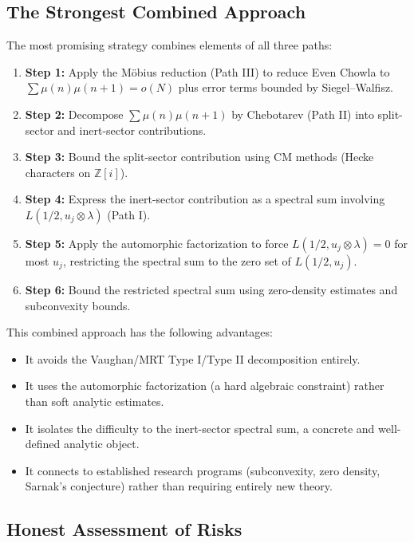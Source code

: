 \documentclass[11pt,a4paper]{article}
\theoremstyle{definition}
\begin{document}
\subsection{The Strongest Combined Approach}

The most promising strategy combines elements of all three paths:

\begin{enumerate}
\item \textbf{Step 1:} Apply the M\"obius reduction (Path III) to reduce Even Chowla to $\sum \mu(n)\mu(n+1) = o(N)$ plus error terms bounded by Siegel--Walfisz.

\item \textbf{Step 2:} Decompose $\sum \mu(n)\mu(n+1)$ by Chebotarev (Path II) into split-sector and inert-sector contributions.

\item \textbf{Step 3:} Bound the split-sector contribution using CM methods (Hecke characters on $\mathbb{Z}[i]$).

\item \textbf{Step 4:} Express the inert-sector contribution as a spectral sum involving $L(1/2, u_j \otimes \lambda)$ (Path I).

\item \textbf{Step 5:} Apply the automorphic factorization to force $L(1/2, u_j \otimes \lambda) = 0$ for most $u_j$, restricting the spectral sum to the zero set of $L(1/2, u_j)$.

\item \textbf{Step 6:} Bound the restricted spectral sum using zero-density estimates and subconvexity bounds.
\end{enumerate}

This combined approach has the following advantages:
\begin{itemize}
\item It avoids the Vaughan/MRT Type I/Type II decomposition entirely.
\item It uses the automorphic factorization (a hard algebraic constraint) rather than soft analytic estimates.
\item It isolates the difficulty to the inert-sector spectral sum, a concrete and well-defined analytic object.
\item It connects to established research programs (subconvexity, zero density, Sarnak's conjecture) rather than requiring entirely new theory.
\end{itemize}

\subsection{Honest Assessment of Risks}
\end{document}
